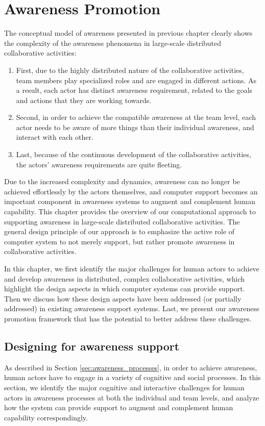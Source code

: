 \graphicspath{{Figures/}}

\chapter{Awareness Promotion} %
\label{cha:awareness_promotion}
The conceptual model of awareness presented in previous chapter clearly shows the complexity of the awareness phenomena in large-scale distributed collaborative activities:

\begin{enumerate}
   \item First, due to the highly distributed nature of the collaborative activities, team members play specialized roles and are engaged in different actions. As a result, each actor has distinct awareness requirement, related to the goals and actions that they are working towards.
   \item Second, in order to achieve the compatible awareness at the team level, each actor needs to be aware of more things than their individual awareness, and interact with each other.
   \item Last, because of the continuous development of the collaborative activities, the actors' awareness requirements are quite fleeting.
\end{enumerate}

Due to the increased complexity and dynamics, awareness can no longer be achieved effortlessly by the actors themselves, and computer support becomes an important component in awareness systems to augment and complement human capability. This chapter provides the overview of our computational approach to supporting awareness in large-scale distributed collaborative activities. The general design principle of our approach is to emphasize the active role of computer system to not merely support, but rather promote awareness in collaborative activities.

In this chapter, we first identify the major challenges for human actors to achieve and develop awareness in distributed, complex collaborative activities, which highlight the design aspects in which computer systems can provide support. Then we discuss how these design aspects have been addressed (or partially addressed) in existing awareness support systems. Last, we present our awareness promotion framework that has the potential to better address these challenges.

\section{Designing for awareness support} %
\label{sec:designing_for_awareness_support}
As described in Section \ref{sec:awareness_processes}, in order to achieve awareness, human actors have to engage in a variety of cognitive and social processes. In this section, we identify the major cognitive and interactive challenges for human actors in awareness processes at both the individual and team levels, and analyze how the system can provide support to augment and complement human capability correspondingly.

